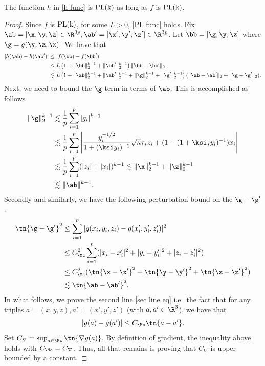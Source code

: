 \begin{lemma} The function $h$ in \eqref{h func} is $\rm{PL}(k)$ as long as $f$ is $\rm{PL}(k)$.
\end{lemma}
\begin{proof} Since $f$ is $\rm{PL}(k)$, for some $L>0$, \eqref{PL func} holds. Fix $\ab=[\x,\y,\z]\in\R^{3p},\ab'=[\x',\y',\z']\in\R^{3p}$. Let $\bb=[\g,\y,\z]$ where $\g=g(\y,\z,\x)$. We have that
\begin{align}
|h(\ab)-h(\ab')|&\leq |f(\bb)-f(\bb')|\\
&\leq L\left(1+\|\bb\|_2^{k-1}+\|\bb'\|_2^{k-1}\right)\|\bb-\bb'\|_2\\
&\lesssim L\left(1+\|\ab\|_2^{k-1}+\|\ab'\|_2^{k-1}+\|\g\|_2^{k-1}+\|\g'\|_2^{k-1}\right)(\|\ab-\ab'\|_2+\|\g-\g'\|_2).
\end{align}
Next, we need to bound the $\g$ term in terms of $\ab$. This is accomplished as follows
\begin{align}
\|\g\|_2^{k-1}&\lesssim \frac{1}{p}\sum_{i=1}^p|g_i|^{k-1}\\
&\lesssim \frac{1}{p}\sum_{i=1}^p\left|\frac{y_i^{-1/2}}{1+(\ksi y_i)^{-1}}\sqrt{\kappa}\tau_* z_i + (1-(1+\ksi_*y_i)^{-1})x_i\right|\\
&\lesssim \frac{1}{p}\sum_{i=1}^p(|z_i|+|x_i|)^{k-1}\lesssim \|\x\|_2^{k-1}+\|\z\|_2^{k-1}\\
&\lesssim \|\ab\|^{k-1}.
\end{align}
Secondly and similarly, we have the following perturbation bound on the $\g-\g'$.  
\begin{align}
\tn{\g-\g'}^2&\leq \sum_{i=1}^p|g(x_i,y_i,z_i)-g(x'_i,y'_i,z'_i)|^2\\
&\leq C^2_{\Mc} \sum_{i=1}^p(|x_i-x'_i|^2+|y_i-y'_i|^2+|z_i-z'_i|^2)\label{sec line eq}\\
&\leq C^2_{\Mc} (\tn{\x-\x'}^2+\tn{\y-\y'}^2+\tn{\z-\z'}^2)\\
&\lesssim \tn{\ab-\ab'}^2.
\end{align}
In what follows, we prove the second line \eqref{sec line eq} i.e.~the fact that for any triples $a=(x,y,z),a'=(x',y',z')$ (with $a,a'\in\R^3$), we have that 
\[
|g(a)-g(a')|\leq C_{\Mc}\tn{a-a'}.
\]
Set $C_\nabla=\sup_{a\in \Mc}\tn{\nabla g(a)}$. By definition of gradient, the inequality above holds with $C_\Mc=C_\nabla$. Thus, all that remains is proving that $C_\nabla$ is upper bounded by a constant. 
\end{proof}
